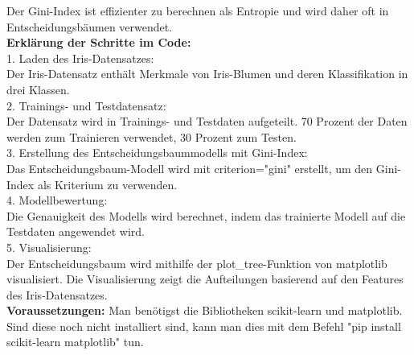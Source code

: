\documentclass[12pt]{article}
\begin{document}
%                   
Der Gini-Index ist effizienter zu berechnen als Entropie und wird daher oft in Entscheidungsbäumen verwendet.\\
\textbf{Erklärung der Schritte im Code:}\\
1. Laden des Iris-Datensatzes:\\
Der Iris-Datensatz enthält Merkmale von Iris-Blumen und deren Klassifikation in drei Klassen.\\
2. Trainings- und Testdatensatz:\\
Der Datensatz wird in Trainings- und Testdaten aufgeteilt. 70 Prozent der Daten werden zum Trainieren verwendet, 30 Prozent zum Testen.\\
3. Erstellung des Entscheidungsbaummodells mit Gini-Index:\\
Das Entscheidungsbaum-Modell wird mit criterion="gini" erstellt, um den Gini-Index als Kriterium zu verwenden.\\
4. Modellbewertung:\\
Die Genauigkeit des Modells wird berechnet, indem das trainierte Modell auf die Testdaten angewendet wird.\\
5. Visualisierung:\\
Der Entscheidungsbaum wird mithilfe der plot\_tree-Funktion von matplotlib visualisiert. Die Visualisierung zeigt die Aufteilungen basierend auf den Features des Iris-Datensatzes.\\[0.2cm]
\textbf{Voraussetzungen:} Man benötigst die Bibliotheken scikit-learn und matplotlib. Sind diese noch nicht installiert sind, kann man dies mit dem Befehl "pip install scikit-learn matplotlib" tun.\\[0.1cm]
%
\end{document}
